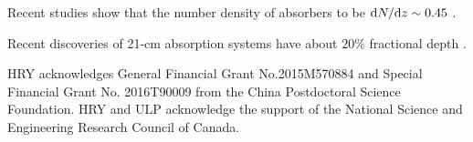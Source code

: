 \documentclass[]{raa}
\newcommand{\diff}{{\rm d}}
\begin{document}
Recent studies show that the number density of absorbers to be $\diff N/\diff z\sim 0.45$
\citep{2005ARA&A..43..861W,2007ASSP....3..501Z}.

Recent discoveries of 21-cm absorption systems have about $20\%$ fractional depth
\citep{2015MNRAS.453.1249A,2015MNRAS.453.1268Z}.


\begin{acknowledgements}
HRY acknowledges General Financial Grant No.2015M570884 and
Special Financial Grant No. 2016T90009 from the China
Postdoctoral Science Foundation.
HRY and ULP acknowledge the support of the
National Science and Engineering Research Council of Canada.
\end{acknowledgements}



\end{document}

